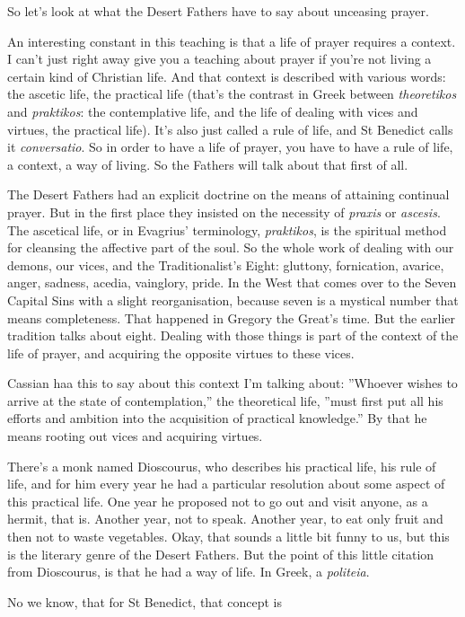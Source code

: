 So let's look at what the Desert Fathers have to say about unceasing prayer.

An interesting constant in this teaching is that a life of prayer requires a context. I can't just right away give you a teaching about prayer if you're not living a certain kind of Christian life. And that context is described with various words: the ascetic life, the practical life (that's the contrast in Greek between \emph{theoretikos} and \emph{praktikos}: the contemplative life, and the life of dealing with vices and virtues, the practical life). It's also just called a rule of life, and St Benedict calls it \emph{conversatio}. So in order to have a life of prayer, you have to have a rule of life, a context, a way of living. So the Fathers will talk about that first of all.

The Desert Fathers had an explicit doctrine on the means of attaining continual prayer. But in the first place they insisted on the necessity of \emph{praxis} or \emph{ascesis}. The ascetical life, or in Evagrius' terminology, \emph{praktikos}, is the spiritual method for cleansing the affective part of the soul. So the whole work of dealing with our demons, our vices, and the Traditionalist's Eight: gluttony, fornication, avarice, anger, sadness, acedia, vainglory, pride. In the West that comes over to the Seven Capital Sins with a slight reorganisation, because seven is a mystical number that means completeness. That happened in Gregory the Great's time. But the earlier tradition talks about eight. Dealing with those things is part of the context of the life of prayer, and acquiring the opposite virtues to these vices.

Cassian haa this to say about this context I'm talking about: ''Whoever wishes to arrive at the state of contemplation,'' the theoretical life, ''must first put all his efforts and ambition into the acquisition of practical knowledge.'' By that he means rooting out vices and acquiring virtues.

There's a monk named Dioscourus, who describes his practical life, his rule of life, and for him every year he had a particular resolution about some aspect of this practical life. One year he proposed not to go out and visit anyone, as a hermit, that is. Another year, not to speak. Another year, to eat only fruit and then not to waste vegetables. Okay, that sounds a little bit funny to us, but this is the literary genre of the Desert Fathers. But the point of this little citation from Dioscourus, is that he had a way of life. In Greek, a \emph{politeia}.

No we know, that for St Benedict, that concept is







